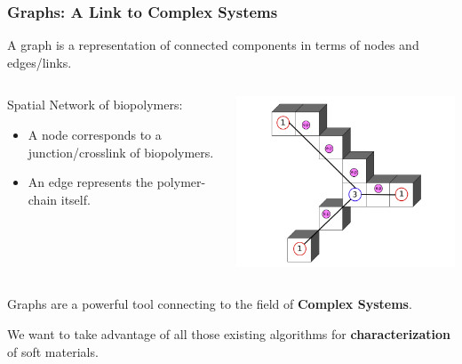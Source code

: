 \documentclass[9pt]{beamer}
\begin{document}
\begin{frame}
  \frametitle{Graphs: A Link to Complex Systems}
  A graph is a representation of connected components in terms of nodes and edges/links.

  \begin{columns}[onlytextwidth]
        \begin{exampleblock}{Spatial Network of biopolymers:}
          \begin{itemize}
            \item A node corresponds to a junction/crosslink of biopolymers.
            \item An edge represents the polymer-chain itself.
          \end{itemize}
        \end{exampleblock}
        \includegraphics[width=0.8\linewidth]{./Figures/spatial_graph.png}
  \end{columns}

  Graphs are a powerful tool connecting to the field of \textbf{Complex Systems}.

  We want to take advantage of all those existing algorithms for \textbf{characterization} of soft materials.

\end{frame}
\end{document}
